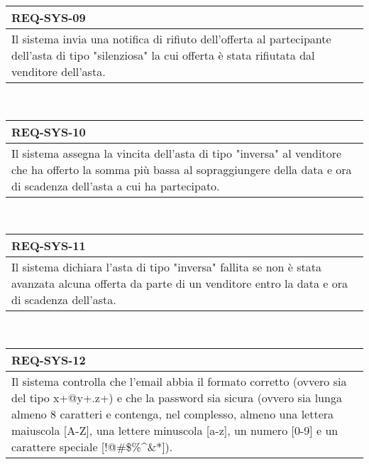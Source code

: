                \begin{tabular}{|p{}|}
                    \hline
                    \multicolumn{1}{|l|}{\cellcolor{head}\textbf{REQ-SYS-09}} \\
                    \hline
                    Il sistema invia una notifica di rifiuto dell'offerta al partecipante dell'asta di tipo "silenziosa" la cui offerta è stata rifiutata dal venditore dell'asta. \\
                    \hline
                \end{tabular} \smallskip \\
                \begin{tabular}{|p{}|}
                    \hline
                    \multicolumn{1}{|l|}{\cellcolor{head}\textbf{REQ-SYS-10}} \\
                    \hline
                    Il sistema assegna la vincita dell'asta di tipo "inversa" al venditore che ha offerto la somma più bassa al sopraggiungere della data e ora di scadenza dell'asta a cui ha partecipato. \\
                    \hline
                \end{tabular} \smallskip \\
                \begin{tabular}{|p{}|}
                    \hline
                    \multicolumn{1}{|l|}{\cellcolor{head}\textbf{REQ-SYS-11}} \\
                    \hline
                    Il sistema dichiara l'asta di tipo "inversa" fallita se non è stata avanzata alcuna offerta da parte di un venditore entro la data e ora di scadenza dell'asta. \\
                    \hline
                \end{tabular} \smallskip \\
                \begin{tabular}{|p{}|}
                    \hline
                    \multicolumn{1}{|l|}{\cellcolor{head}\textbf{REQ-SYS-12}} \\
                    \hline
                    Il sistema controlla che l'email abbia il formato corretto (ovvero sia del tipo x+@y+.z+) e che la password sia sicura (ovvero sia lunga almeno 8 caratteri e contenga, nel complesso, almeno una lettera maiuscola [A-Z], una lettere minuscola [a-z], un numero [0-9] e un carattere speciale [!@\#\$\%\^{}\&*]). \\
                    \hline
                \end{tabular} \smallskip \\
